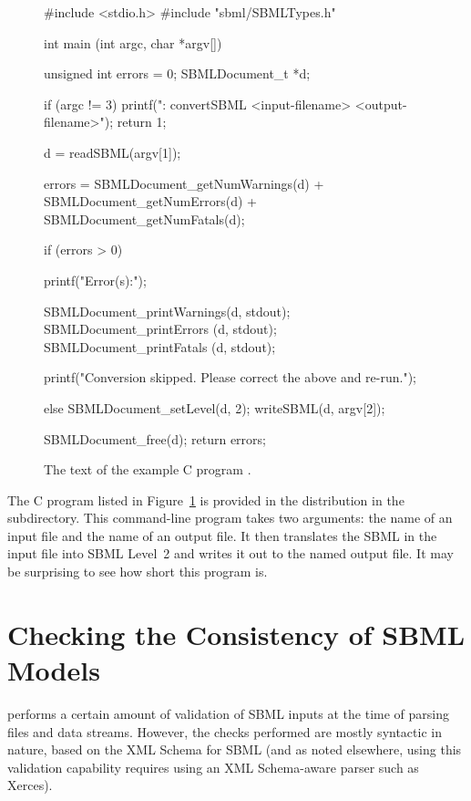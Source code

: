 \documentclass{sbmlmanual}
\begin{document}
\begin{figure}[bth]
  \begin{boxedCodeVerbatim}
#include <stdio.h>
#include "sbml/SBMLTypes.h"

int
main (int argc, char *argv[])
{
  unsigned int errors = 0;
  SBMLDocument_t *d;

  if (argc != 3)
  {
    printf("\nusage: convertSBML <input-filename> <output-filename>\n\n");
    return 1;
  }

  d = readSBML(argv[1]);

  errors = SBMLDocument_getNumWarnings(d) + SBMLDocument_getNumErrors(d) +
           SBMLDocument_getNumFatals(d);

  if (errors > 0)
  {
    printf("Error(s):\n");

    SBMLDocument_printWarnings(d, stdout);
    SBMLDocument_printErrors  (d, stdout);
    SBMLDocument_printFatals  (d, stdout);

    printf("Conversion skipped.  Please correct the above and re-run.\n");
  }
  else
  {
    SBMLDocument_setLevel(d, 2);
    writeSBML(d, argv[2]);
  }

  SBMLDocument_free(d);
  return errors;
}
  \end{boxedCodeVerbatim}
  \caption{The text of the example C program .}
  \label{fig:convert-sbml}
\end{figure}


The C program listed in Figure~\ref{fig:convert-sbml} is provided in the
\libsbml{} distribution in the  subdirectory.  This
command-line program takes two arguments: the name of an input file and the
name of an output file.  It then translates the SBML in the input file into
SBML Level~2 and writes it out to the named output file.  It may be
surprising to see how short this program is.


\section{Checking the Consistency of SBML Models}
\label{sec:consistency-checking}

\libsbml{} performs a certain amount of validation of SBML inputs at the
time of parsing files and data streams.  However, the checks performed are
mostly syntactic in nature, based on the XML Schema for SBML (and as noted
elsewhere, using this validation capability requires using an XML
Schema-aware parser such as Xerces).
\end{document}

